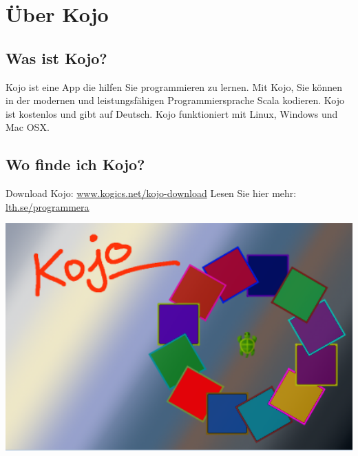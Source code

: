 \chapter{Über Kojo}
\begin{multicols}{2}
\section*{\color{black}Was ist Kojo?}
Kojo ist eine App die hilfen Sie programmieren zu lernen. Mit Kojo, Sie können in der modernen und leistungsfähigen Programmiersprache Scala kodieren. Kojo ist kostenlos und gibt auf Deutsch. Kojo funktioniert mit Linux, Windows und Mac OSX.
\section*{\color{black}Wo finde ich Kojo?}
Download Kojo: 
\href{http://www.kogics.net/kojo-download}{www.kogics.net/kojo-download}
Lesen Sie hier mehr: 
\href{http://lth.se/programmera}{lth.se/programmera}

\columnbreak

\includegraphics[width=14cm]{../img/kojo.png}
\end{multicols}


